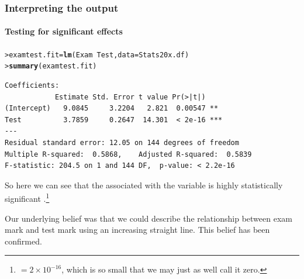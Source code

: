\documentclass{beamer}\usepackage[]{graphicx}\usepackage[]{xcolor}
\makeatletter
\newcommand{\hlopt}[1]{\textcolor[rgb]{0,0,0}{#1}}%
\newcommand{\hlstd}[1]{\textcolor[rgb]{0.345,0.345,0.345}{#1}}%
\newcommand{\hlkwb}[1]{\textcolor[rgb]{0.69,0.353,0.396}{#1}}%
\newcommand{\hlkwc}[1]{\textcolor[rgb]{0.333,0.667,0.333}{#1}}%
\newcommand{\hlkwd}[1]{\textcolor[rgb]{0.737,0.353,0.396}{\textbf{#1}}}%
\newenvironment{kframe}{%
 \def\at@end@of@kframe{}%
 \ifinner\ifhmode%
  \def\at@end@of@kframe{\end{minipage}}%
  \begin{minipage}{\columnwidth}%
 \fi\fi%
 \def\FrameCommand##1{\hskip\@totalleftmargin \hskip-\fboxsep
 \colorbox{shadecolor}{##1}\hskip-\fboxsep
     \hskip-\linewidth \hskip-\@totalleftmargin \hskip\columnwidth}%
 \MakeFramed {\advance\hsize-\width
   \@totalleftmargin\z@ \linewidth\hsize
   \@setminipage}}%
 {\par\unskip\endMakeFramed%
 \at@end@of@kframe}
\newenvironment{knitrout}{}{} %
\makeatother
\begin{document}
\begin{frame}[fragile]
\frametitle{Interpreting the output}
\framesubtitle{Testing for significant effects}

\begin{knitrout}\scriptsize
{}\color{fgcolor}\begin{kframe}
\begin{alltt}
\hlstd{> }\hlstd{examtest.fit} \hlkwb{=} \hlkwd{lm}\hlstd{(Exam} \hlopt{~} \hlstd{Test,} \hlkwc{data} \hlstd{= Stats20x.df)}
\hlstd{> }\hlkwd{summary}\hlstd{(examtest.fit)}
\end{alltt}
\end{kframe}
\end{knitrout}
\begin{knitrout}\scriptsize
{}\color{fgcolor}\begin{kframe}
\begin{verbatim}
Coefficients:
            Estimate Std. Error t value Pr(>|t|)    
(Intercept)   9.0845     3.2204   2.821  0.00547 ** 
Test          3.7859     0.2647  14.301  < 2e-16 ***
---
Residual standard error: 12.05 on 144 degrees of freedom
Multiple R-squared:  0.5868,	Adjusted R-squared:  0.5839 
F-statistic: 204.5 on 1 and 144 DF,  p-value: < 2.2e-16
\end{verbatim}
\end{kframe}
\end{knitrout}

So here we can see that the \pval{} associated with the  variable is highly statistically significant .\footnote{ $ = 2\times 10^{-16}$, which is so small that we may just as well call it zero.}

Our underlying belief was that we could describe the relationship between exam mark and test mark using an increasing straight line. This belief has been confirmed.

\end{frame}
\end{document}
